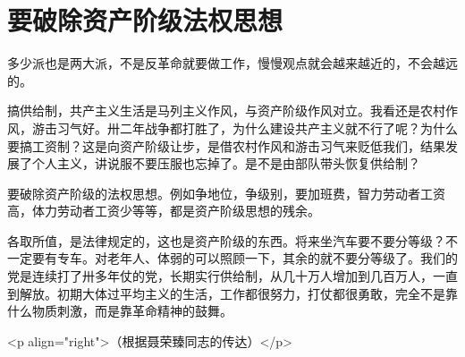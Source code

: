 \section[要破除资产阶级法权思想（一九六七年五月）]{要破除资产阶级法权思想}


多少派也是两大派，不是反革命就要做工作，慢慢观点就会越来越近的，不会越远的。

搞供给制，共产主义生活是马列主义作风，与资产阶级作风对立。我看还是农村作风，游击习气好。卅二年战争都打胜了，为什么建设共产主义就不行了呢？为什么要搞工资制？这是向资产阶级让步，是借农村作风和游击习气来贬低我们，结果发展了个人主义，讲说服不要压服也忘掉了。是不是由部队带头恢复供给制？

要破除资产阶级的法权思想。例如争地位，争级别，要加班费，智力劳动者工资高，体力劳动者工资少等等，都是资产阶级思想的残余。

各取所值，是法律规定的，这也是资产阶级的东西。将来坐汽车要不要分等级？不一定要有专车。对老年人、体弱的可以照顾一下，其余的就不要分等级了。我们的党是连续打了卅多年仗的党，长期实行供给制，从几十万人增加到几百万人，一直到解放。初期大体过平均主义的生活，工作都很努力，打仗都很勇敢，完全不是靠什么物质刺激，而是靠革命精神的鼓舞。

<p align="right">（根据聂荣臻同志的传达）</p>


